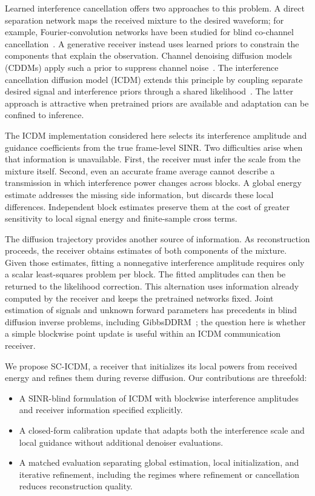 \documentclass[conference]{IEEEtran}
\newcommand{\method}{SC-ICDM}
\begin{document}
Learned interference cancellation offers two approaches to this problem.
A direct separation network maps the received mixture to the desired
waveform; for example, Fourier-convolution networks have been studied for
blind co-channel cancellation~\cite{naseri2024blind}. A generative receiver
instead uses learned priors to constrain the components that explain the
observation. Channel denoising diffusion models (CDDMs) apply such a prior
to suppress channel noise~\cite{wu2024cddm}. The interference cancellation
diffusion model (ICDM) extends this principle by coupling separate desired
signal and interference priors through a shared likelihood~\cite{wu2026icdm}.
The latter approach is attractive when pretrained priors are available
and adaptation can be confined to inference.

The ICDM implementation considered here selects its interference amplitude
and guidance coefficients from the true frame-level SINR. Two difficulties
arise when that information is unavailable. First, the receiver must infer
the scale from the mixture itself. Second, even an accurate frame average
cannot describe a transmission in which interference power changes across
blocks. A global energy estimate addresses the missing side information,
but discards these local differences. Independent block estimates preserve
them at the cost of greater sensitivity to local signal energy and
finite-sample cross terms.

The diffusion trajectory provides another source of information. As
reconstruction proceeds, the receiver obtains estimates of both components
of the mixture. Given those estimates, fitting a nonnegative interference
amplitude requires only a scalar least-squares problem per block. The fitted
amplitudes can then be returned to the likelihood correction. This
alternation uses information already computed by the receiver and keeps
the pretrained networks fixed. Joint estimation of signals and unknown
forward parameters has precedents in blind diffusion inverse problems,
including GibbsDDRM~\cite{murata2023gibbsddrm}; the question here is whether
a simple blockwise point update is useful within an ICDM communication
receiver.

We propose \method{}, a receiver that initializes its local powers from
received energy and refines them during reverse diffusion. Our contributions
are threefold:
\begin{itemize}
    \item A SINR-blind formulation of ICDM with blockwise interference
    amplitudes and receiver information specified explicitly.
    \item A closed-form calibration update that adapts both the interference
    scale and local guidance without additional denoiser evaluations.
    \item A matched evaluation separating global estimation, local
    initialization, and iterative refinement, including the regimes where
    refinement or cancellation reduces reconstruction quality.
\end{itemize}
\end{document}
